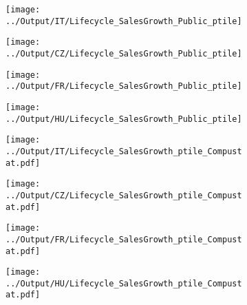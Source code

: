 \documentclass[12pt,notitlepage]{article}
\begin{document}
\begin{figure}[!htpb]
\centering
\caption{Sales Growth (Percentile - Public)}
\begin{subfigure}{.49\textwidth}
    \centering
 \texttt{[image: ../Output/IT/Lifecycle\_SalesGrowth\_Public\_ptile]}
\end{subfigure}%
\begin{subfigure}{.49\textwidth}
    \centering
 \texttt{[image: ../Output/CZ/Lifecycle\_SalesGrowth\_Public\_ptile]}
\end{subfigure}
\begin{subfigure}{.49\textwidth}
    \centering
 \texttt{[image: ../Output/FR/Lifecycle\_SalesGrowth\_Public\_ptile]}
\end{subfigure}%
\begin{subfigure}{.49\textwidth}
    \centering
 \texttt{[image: ../Output/HU/Lifecycle\_SalesGrowth\_Public\_ptile]}
\end{subfigure}
\end{figure}
\pagebreak

\begin{figure}[!htpb]
\centering
\caption{Sales Growth (Percentile)}
\begin{subfigure}{.49\textwidth}
    \centering
 \texttt{[image: ../Output/IT/Lifecycle\_SalesGrowth\_ptile\_Compustat.pdf]}
\end{subfigure}%
\begin{subfigure}{.49\textwidth}
    \centering
 \texttt{[image: ../Output/CZ/Lifecycle\_SalesGrowth\_ptile\_Compustat.pdf]}
\end{subfigure}
\begin{subfigure}{.49\textwidth}
    \centering
 \texttt{[image: ../Output/FR/Lifecycle\_SalesGrowth\_ptile\_Compustat.pdf]}
\end{subfigure}%
\begin{subfigure}{.49\textwidth}
    \centering
 \texttt{[image: ../Output/HU/Lifecycle\_SalesGrowth\_ptile\_Compustat.pdf]}
\end{subfigure}
\end{figure}
\pagebreak



\end{document}
